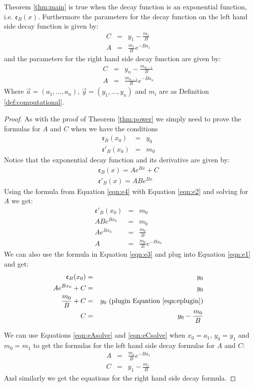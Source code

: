 \documentclass[10pt]{article}
\begin{document}
\begin{theorem}
\label{thm:exponential}
Theorem \ref{thm:main} is true when the decay function is an exponential function, i.e.
$\mathfrak{e}_{B}(x)$.  Furthermore the parameters for the decay function on the left hand
side decay function is given by:
\begin{eqnarray*}
C&=&y_1 - \frac{m_1}{B}\\
A&=&\frac{m_1}{B} e^{-Ba_1}
\end{eqnarray*}
and the parameters for the right hand side decay function are given by:
\begin{eqnarray*}
C&=&y_n - \frac{m_{n-1}}{B}\\
A&=&\frac{m_{n-1}}{B} e^{-Ba_n}
\end{eqnarray*}
Where $\vec{a}=(a_1, \ldots, a_n)$, $\vec{y}=(y_1,\ldots,y_n)$ and $m_i$ are
as Definition \ref{def:computational}.
\end{theorem}
\begin{proof}
As with the proof of Theorem \ref{thm:power} we simply need to prove the
formulas for $A$ and $C$ when we have the conditions
\begin{eqnarray}
\mathfrak{e}_{B}(x_0) &=& y_0 \label{eqn:e1}\\
\mathfrak{e}'_{B}(x_0) &=& m_0 \label{eqn:e2}
\end{eqnarray}
Notice that the exponential decay function and its derivative are given by:
\begin{eqnarray}
\mathfrak{e}_{B}(x) = Ae^{Bx}+C \label{eqn:e3}\\
\mathfrak{e}'_{B}(x) = ABe^{Bx} \label{eqn:e4}
\end{eqnarray}
Using the formula from Equation \ref{eqn:e4} with Equation \ref{eqn:e2} and
solving for $A$ we get:
\begin{eqnarray}
\mathfrak{e}'_{B}(x_0) &=& m_0 \\
ABe^{Bx_0} &=& m_0 \\
Ae^{Bx_0} &=& \frac{m_0}{B} \label{eqn:eplugin}\\
A &=& \frac{m_0}{B} e^{-Bx_0} \label{eqn:eAsolve}
\end{eqnarray}
We can also use the formula in Equation \ref{eqn:e3} and plug into Equation \ref{eqn:e1}
and get:
\begin{eqnarray}
\mathfrak{e}_{B}(x_0) &=& y_0 \\
Ae^{Bx_0} + C &=& y_0 \\
\frac{m_0}{B} + C &=& y_0 \hbox{ (plugin Equation \ref{eqn:eplugin})} \\
C &=& y_0 - \frac{m_0}{B} \label{eqn:eCsolve}
\end{eqnarray}

We can use Equations \ref{eqn:eAsolve} and \ref{eqn:eCsolve} when $x_0=a_1$,
$y_0=y_1$ and $m_0=m_1$ to get the formulas for the left hand side decay formulas
for $A$ and $C$:
\begin{eqnarray*}
A &=& \frac{m_1}{B} e^{-Ba_1}\\
C &=& y_1 - \frac{m_1}{B}
\end{eqnarray*}
And similarly we get the equations for the right hand side decay formula.
\end{proof}
%
%
\end{document}
